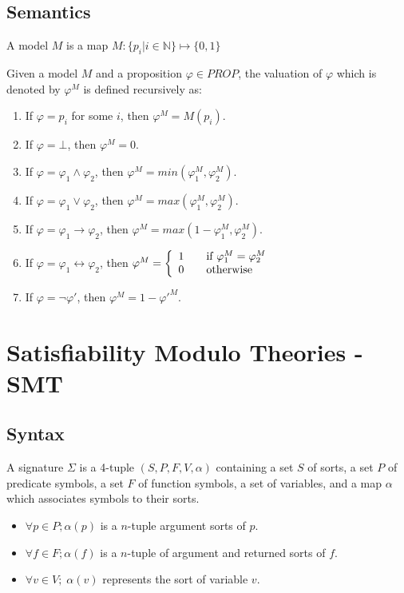 \subsection{Semantics}
\begin{definition}
A model $M$ is a map $M : \{p_i | i \in \mathbb{N}\} \mapsto \{0, 1\}$
\end{definition}
\begin{definition} \label{def:pro-val}
Given a model $M$ and a proposition $\varphi \in PROP$, the valuation of $\varphi$ which is denoted by $\varphi^M$ is defined recursively as:
\begin{enumerate}
\item If $\varphi = p_i$ for some $i$, then $\varphi^M = M(p_i)$.
\item If $\varphi = \bot$, then $\varphi^M = 0$.
\item If $\varphi = \varphi_1 \wedge \varphi_2$, then $\varphi^M = min(\varphi_1^M,
 \varphi_2^M)$.
\item If $\varphi = \varphi_1 \vee \varphi_2$, then $\varphi^M = max(\varphi_1^M, \varphi_2^M)$.
\item If $\varphi = \varphi_1 \rightarrow \varphi_2$, then $\varphi^M = max(1 - \varphi_1^M, \varphi_2^M)$. 
\item If $\varphi = \varphi_1 \leftrightarrow \varphi_2$, then $\varphi^M = \left\{ 
  \begin{array}{c l}
    1 & \quad \text{if } \varphi_1^M = \varphi_2^M\\
    0 & \quad \text{otherwise }\\
  \end{array} \right.$
\item If $\varphi = \neg \varphi'$, then $\varphi^M = 1 - \varphi'^M$.
\end{enumerate}
\end{definition}

\section{Satisfiability Modulo Theories - SMT}
\subsection{Syntax} \label{subsection:smt-syntax}
\begin{definition}
A signature $\Sigma$ is a 4-tuple $(S, P, F, V, \alpha)$ containing a set $S$ of sorts, a set $P$ of predicate symbols, a set $F$ of function symbols, a set of variables, and a map $\alpha$ which associates symbols to their sorts.
\begin{itemize}
\item $\forall p \in P; \alpha(p)$ is a $n$-tuple argument sorts of $p$.
\item $\forall f \in F; \alpha(f)$ is a $n$-tuple of argument and returned sorts of $f$.
\item $\forall v \in V; \; \alpha(v)$ represents the sort of variable $v$.
\end{itemize}
\end{definition}
 
